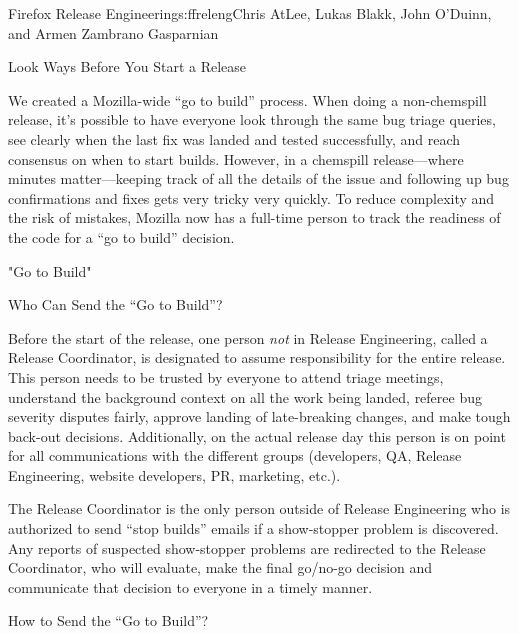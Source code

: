 \begin{aosachapter}{Firefox Release Engineering}{s:ffreleng}{Chris AtLee, Lukas Blakk, John O'Duinn, and Armen Zambrano Gasparnian}
\begin{aosasect1}{Look  Ways Before You Start a Release}
\begin{aosaenumerate}
\item We created a Mozilla-wide ``go to build'' process. When doing a
  non-chemspill release, it's possible to have everyone look
  through the same bug triage queries, see clearly when
  the last fix was landed and tested successfully, and reach consensus on
  when to start builds. However, in a chemspill release---where
  minutes matter---keeping track of all the details of the issue and
  following up bug confirmations and fixes gets very tricky very
  quickly.  To reduce complexity and the risk of mistakes, Mozilla
  now has a full-time person 
  to track the readiness of the code for a ``go to build''
  decision.  

\end{aosaenumerate}


\end{aosasect1}

\begin{aosasect1}{"Go to Build"}

\begin{aosasect2}{Who Can Send the ``Go to Build''?}

Before the start of the release, one person \emph{not} in Release Engineering, called a Release Coordinator, is designated to assume
responsibility for the entire release. This person needs to be
trusted by everyone to attend triage meetings, understand the
background context on all the work being landed, referee bug severity
disputes fairly, approve landing of late-breaking changes, and make
tough back-out decisions.  Additionally, on the actual release day
this person is on point for all communications with the different
groups (developers, QA, Release Engineering, website developers, PR,
marketing, etc.).

The Release Coordinator is the only person outside of Release
Engineering who is authorized to send ``stop builds'' emails if a
show-stopper problem is discovered. Any reports of
suspected show-stopper problems are redirected to the Release
Coordinator, who will evaluate, make the final go/no-go decision and
communicate that decision to everyone in a timely manner.

\end{aosasect2}

\begin{aosasect2}{How to Send the ``Go to Build''?}


\end{aosasect2}
\end{aosasect1}
\end{aosachapter}
